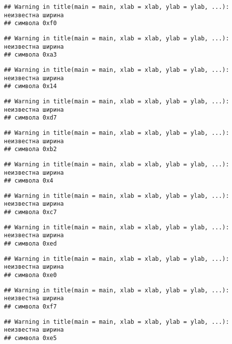 \documentclass[,]{article}
\begin{document}
\begin{verbatim}
## Warning in title(main = main, xlab = xlab, ylab = ylab, ...): неизвестна ширина
## символа 0xf0
\end{verbatim}

\begin{verbatim}
## Warning in title(main = main, xlab = xlab, ylab = ylab, ...): неизвестна ширина
## символа 0xa3
\end{verbatim}

\begin{verbatim}
## Warning in title(main = main, xlab = xlab, ylab = ylab, ...): неизвестна ширина
## символа 0x14
\end{verbatim}

\begin{verbatim}
## Warning in title(main = main, xlab = xlab, ylab = ylab, ...): неизвестна ширина
## символа 0xd7
\end{verbatim}

\begin{verbatim}
## Warning in title(main = main, xlab = xlab, ylab = ylab, ...): неизвестна ширина
## символа 0xb2
\end{verbatim}

\begin{verbatim}
## Warning in title(main = main, xlab = xlab, ylab = ylab, ...): неизвестна ширина
## символа 0x4
\end{verbatim}

\begin{verbatim}
## Warning in title(main = main, xlab = xlab, ylab = ylab, ...): неизвестна ширина
## символа 0xc7
\end{verbatim}

\begin{verbatim}
## Warning in title(main = main, xlab = xlab, ylab = ylab, ...): неизвестна ширина
## символа 0xed
\end{verbatim}

\begin{verbatim}
## Warning in title(main = main, xlab = xlab, ylab = ylab, ...): неизвестна ширина
## символа 0xe0
\end{verbatim}

\begin{verbatim}
## Warning in title(main = main, xlab = xlab, ylab = ylab, ...): неизвестна ширина
## символа 0xf7
\end{verbatim}

\begin{verbatim}
## Warning in title(main = main, xlab = xlab, ylab = ylab, ...): неизвестна ширина
## символа 0xe5
\end{verbatim}
\end{document}
